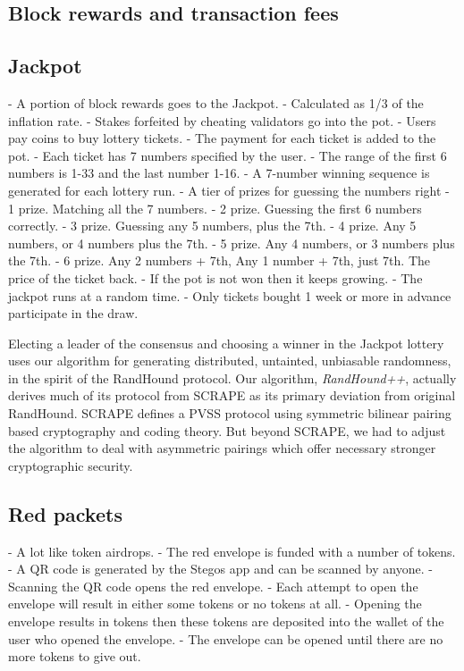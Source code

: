 \documentclass[a4paper, 10pt, conference]{ieeeconf}
\begin{document}
\subsection{Block rewards and transaction fees}\label{BlockRewardsAndFees}

\subsection{Jackpot}\label{Jackpot}

- A portion of block rewards goes to the Jackpot. 
- Calculated as 1/3 of the inflation rate.
- Stakes forfeited by cheating validators go into the pot.
- Users pay coins to buy lottery tickets.
- The payment for each ticket is added to the pot.
- Each ticket has 7 numbers specified by the user. 
	- The range of the first 6 numbers is 1-33 and the last number 1-16.
- A 7-number winning sequence is generated for each lottery run.
- A tier of prizes for guessing the numbers right 
	- 1 prize. Matching all the 7 numbers.
	- 2 prize. Guessing the first 6 numbers correctly.
	- 3 prize. Guessing any 5 numbers, plus the 7th.
	- 4 prize. Any 5 numbers, or 4 numbers plus the 7th.
	- 5 prize. Any 4 numbers, or 3 numbers plus the 7th. 
	- 6 prize. Any 2 numbers + 7th, Any 1 number + 7th, just 7th. The price of the ticket back.
- If the pot is not won then it keeps growing. 
- The jackpot runs at a random time. 
- Only tickets bought 1 week or more in advance participate in the draw.

Electing a leader of the consensus and choosing a winner in the Jackpot lottery uses our algorithm for generating distributed, untainted, unbiasable randomness, in the spirit of the RandHound protocol\cite{c12}. Our algorithm, \textit{RandHound++}, actually derives much of its protocol from SCRAPE\cite{c13} as its primary deviation from original RandHound. SCRAPE defines a PVSS\cite{c14} protocol using symmetric bilinear pairing based cryptography and coding theory. But beyond SCRAPE, we had to adjust the algorithm to deal with asymmetric pairings which offer necessary stronger cryptographic security.

\subsection{Red packets}\label{RedPackets}

- A lot like token airdrops. 
- The red envelope is funded with a number of tokens.
- A QR code is generated by the Stegos app and can be scanned by anyone. 
- Scanning the QR code opens the red envelope.
- Each attempt to open the envelope will result in either some tokens or no tokens at all.
- Opening the envelope results in tokens then these tokens are deposited into the wallet of the user who opened the envelope.
- The envelope can be opened until there are no more tokens to give out.
\end{document}
